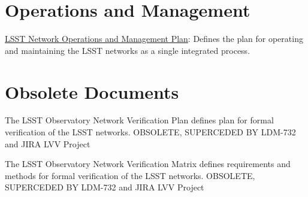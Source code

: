 \section{Operations and Management}

\href{https://confluence.lsstcorp.org/download/attachments/20284335/LSST%20Network%20O%26M%20Plan_v2.docx?version=1&modificationDate=1490879794000&api=v2}{LSST Network Operations and Management Plan}: Defines the plan for operating and maintaining the LSST networks as a single integrated process.

\section{Obsolete Documents}

The LSST Observatory Network Verification Plan defines plan for formal verification of the LSST networks.  OBSOLETE, SUPERCEDED BY LDM-732 and JIRA LVV Project

The LSST Observatory Network Verification Matrix defines requirements and methods for formal verification of the LSST networks. OBSOLETE, SUPERCEDED BY LDM-732 and JIRA LVV Project

